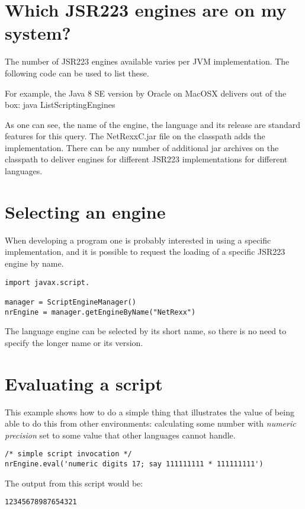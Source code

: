 \section{Which JSR223 engines are on my system?}
The number of JSR223 engines available varies per JVM
implementation. The following code can be used to list these.
 

For example, the Java 8 SE version by Oracle on MacOSX delivers out of
the box:
\bash[stdout]
java ListScriptingEngines
\END

As one can see, the name of the engine, the language and its release are standard features for this query. The NetRexxC.jar file on the classpath adds the \nr{} implementation.
There can be any number of additional jar archives on the classpath to deliver engines for different JSR223 implementations for different languages.
\section{Selecting an engine}
When developing a program one is probably interested in using a specific implementation, and it is possible to request the loading of a specific JSR223 engine by name.
\begin{lstlisting}[label=choosingjsr223,caption=Choosing an engine]
import javax.script.

manager = ScriptEngineManager()
nrEngine = manager.getEngineByName("NetRexx")
\end{lstlisting}
The language engine can be selected by its short name, so there is no need to specify the longer name or its version.
\section{Evaluating a script}
This example shows how to do a simple thing that illustrates the value of being able to do this from other environments: calculating some number with \emph{numeric precision} set to some value that other languages cannot handle.
\begin{lstlisting}[label=evaljsr223,caption=Evaluating a script]
/* simple script invocation */
nrEngine.eval('numeric digits 17; say 111111111 * 111111111')
\end{lstlisting}
The output from this script would be:
\begin{alltt}
12345678987654321
\end{alltt}
